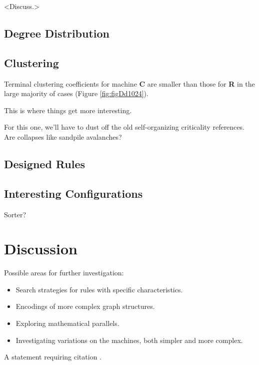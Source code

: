 \documentclass{tufte-handout}
\begin{document}
<Discuss.>

\subsection{Degree Distribution}

\subsection{Clustering}

Terminal clustering coefficients for machine \textbf{C} are smaller than those for \textbf{R} in
the large majority of cases (Figure \ref{fig:figDd1024}).

This is where things get more interesting.

For this one, we'll have to dust off the old self-organizing criticality
references. Are collapses like sandpile avalanches?

\subsection{Designed Rules}

\subsection{Interesting Configurations}
Sorter?


\section{Discussion}

Possible areas for further investigation:

\begin{itemize}
    \item Search strategies for rules with specific characteristics.
    \item Encodings of more complex graph structures.
    \item Exploring mathematical parallels.
    \item Investigating variations on the machines, both simpler and more complex.
\end{itemize}

A statement requiring citation \cite{Figueredo:2009dg}.

\end{document}
